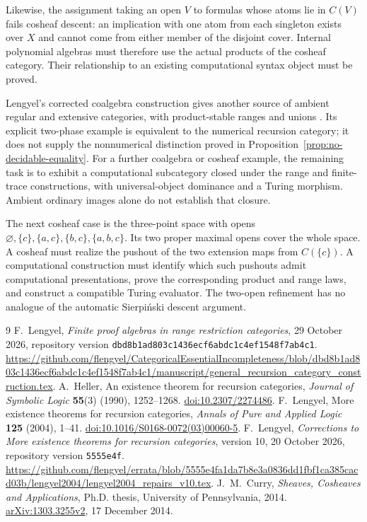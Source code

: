 \documentclass[11pt]{article}
\theoremstyle{definition}\newtheorem{definition}[theorem]{Definition}
\theoremstyle{remark}\newtheorem{remark}[theorem]{Remark}
\begin{document}
Likewise, the assignment taking an open \(V\) to formulas whose
atoms lie in \(C(V)\) fails cosheaf descent: an implication with
one atom from each singleton exists over \(X\) and cannot come
from either member of the disjoint cover. Internal polynomial
algebras must therefore use the actual products of the cosheaf
category. Their relationship to an existing computational syntax
object must be proved.

Lengyel's corrected coalgebra construction gives another source
of ambient regular and extensive categories, with product-stable
ranges and unions \cite[\S\S8--10]{Repairs}. Its explicit
two-phase example is equivalent to the numerical recursion
category; it does not supply the nonnumerical distinction proved
in Proposition~\ref{prop:no-decidable-equality}. For a further
coalgebra or cosheaf example, the remaining task is to exhibit a
computational subcategory closed under the range and finite-trace
constructions, with universal-object dominance and a Turing
morphism. Ambient ordinary images alone do not establish that
closure.

The next cosheaf case is the three-point space with opens
\(\varnothing,\{c\},\{a,c\},\{b,c\},\{a,b,c\}\).
Its two proper maximal opens cover the whole space. A cosheaf
must realize the pushout of the two extension maps from
\(C(\{c\})\). A computational construction must identify which
such pushouts admit computational presentations, prove the
corresponding product and range laws, and construct a compatible
Turing evaluator. The two-open refinement has no analogue of the
automatic Sierpi\'nski descent argument.

\begin{thebibliography}{9}
 F.~Lengyel,
\emph{Finite proof algebras in range restriction categories},
29 October 2026, repository version
\texttt{dbd8b1ad803c1436ecf6abdc1c4ef1548f7ab4c1}.
\url{https://github.com/flengyel/CategoricalEssentialIncompleteness/blob/dbd8b1ad803c1436ecf6abdc1c4ef1548f7ab4c1/manuscript/general_recursion_category_construction.tex}.
 A.~Heller,
An existence theorem for recursion categories,
\emph{Journal of Symbolic Logic} \textbf{55}(3) (1990), 1252--1268.
\href{https://doi.org/10.2307/2274486}{doi:10.2307/2274486}.
 F.~Lengyel,
More existence theorems for recursion categories,
\emph{Annals of Pure and Applied Logic} \textbf{125} (2004), 1--41.
\href{https://doi.org/10.1016/S0168-0072(03)00060-5}{doi:10.1016/S0168-0072(03)00060-5}.
 F.~Lengyel,
\emph{Corrections to More existence theorems for recursion categories},
version 10, 20 October 2026, repository version \texttt{5555e4f}.
\url{https://github.com/flengyel/errata/blob/5555e4fa1da7b8e3a0836dd1fbf1ca385cacd03b/lengyel2004/lengyel2004_repairs_v10.tex}.
 J.~M.~Curry,
\emph{Sheaves, Cosheaves and Applications},
Ph.D. thesis, University of Pennsylvania, 2014.
\href{https://arxiv.org/abs/1303.3255}{arXiv:1303.3255v2},
17 December 2014.
\end{thebibliography}
\end{document}
